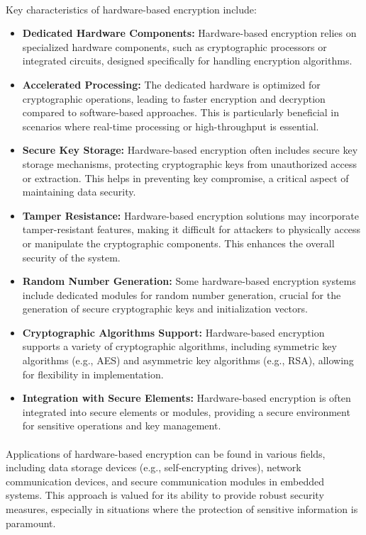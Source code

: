  \paragraph*{}
 Key characteristics of hardware-based encryption include:
 \begin{itemize}
 	\item \textbf{Dedicated Hardware Components:} Hardware-based encryption relies on specialized hardware components, such as cryptographic processors or integrated circuits, designed specifically for handling encryption algorithms.
 	\item \textbf{Accelerated Processing:} The dedicated hardware is optimized for cryptographic operations, leading to faster encryption and decryption compared to software-based approaches. This is particularly beneficial in scenarios where real-time processing or high-throughput is essential.
 	\item \textbf{Secure Key Storage:} Hardware-based encryption often includes secure key storage mechanisms, protecting cryptographic keys from unauthorized access or extraction. This helps in preventing key compromise, a critical aspect of maintaining data security.
 	\item \textbf{Tamper Resistance:} Hardware-based encryption solutions may incorporate tamper-resistant features, making it difficult for attackers to physically access or manipulate the cryptographic components. This enhances the overall security of the system.
 	\item \textbf{Random Number Generation:} Some hardware-based encryption systems include dedicated modules for random number generation, crucial for the generation of secure cryptographic keys and initialization vectors.
 	\item \textbf{Cryptographic Algorithms Support:} Hardware-based encryption supports a variety of cryptographic algorithms, including symmetric key algorithms (e.g., AES) and asymmetric key algorithms (e.g., RSA), allowing for flexibility in implementation.
 	\item \textbf{Integration with Secure Elements:} Hardware-based encryption is often integrated into secure elements or modules, providing a secure environment for sensitive operations and key management.
 \end{itemize}
 \paragraph*{}
Applications of hardware-based encryption can be found in various fields, including data storage devices (e.g., self-encrypting drives), network communication devices, and secure communication modules in embedded systems. This approach is valued for its ability to provide robust security measures, especially in situations where the protection of sensitive information is paramount.
